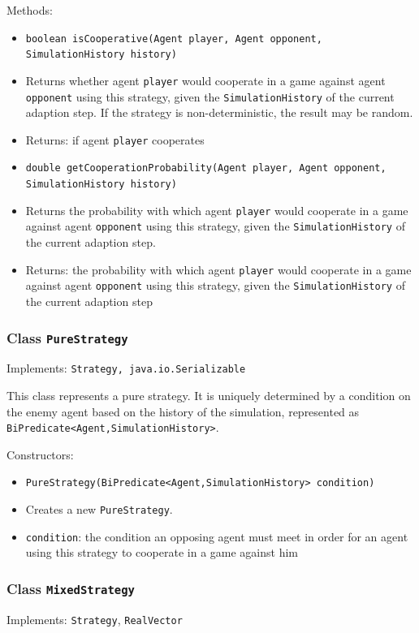 \documentclass[parskip=full,11pt]{scrartcl}
\begin{document}
Methods:
\begin{itemize}\itemsep -10pt
\item \texttt{boolean isCooperative(Agent player, Agent opponent, SimulationHistory history)}
\item[] Returns whether agent \texttt{player} would cooperate in a game against agent \texttt{opponent} using this strategy, given the \texttt{SimulationHistory} of the current adaption step. If the strategy is non-deterministic, the result may be random.
\item[] Returns: if agent \texttt{player} cooperates

\item \texttt{double getCooperationProbability(Agent player, Agent opponent, SimulationHistory history)}
\item[] Returns the probability with which agent \texttt{player} would cooperate in a game against agent \texttt{opponent} using this strategy, given the \texttt{SimulationHistory} of the current adaption step.
\item[] Returns: the probability with which agent \texttt{player} would cooperate in a game against agent \texttt{opponent} using this strategy, given the \texttt{SimulationHistory} of the current adaption step
\end{itemize}

\subsubsection{Class \texttt{PureStrategy}}
Implements: \texttt{Strategy, java.io.Serializable}

This class represents a pure strategy. It is uniquely determined by a condition on the enemy agent based on the history of the simulation, represented as\\	\texttt{BiPredicate<Agent,SimulationHistory>}.

Constructors:
\begin{itemize}\itemsep -10pt
\item \texttt{PureStrategy(BiPredicate<Agent,SimulationHistory> condition)}
\item[] Creates a new \texttt{PureStrategy}.
\item[] \texttt{condition}: the condition an opposing agent must meet in order for an agent using this strategy to cooperate in a game against him
\end{itemize}

\subsubsection{Class \texttt{MixedStrategy}}
Implements: \texttt{Strategy}, \texttt{RealVector}
\end{document}
